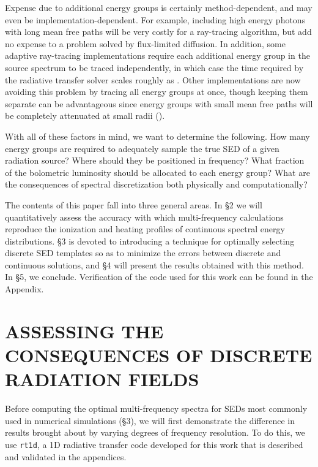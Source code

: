 \documentclass[preprint2]{aastex}              %
\begin{document}
Expense due to additional energy groups is certainly method-dependent, and may even be implementation-dependent.  For example, including high energy photons with long mean free paths will be very costly for a ray-tracing algorithm, but add no expense to a problem solved by flux-limited diffusion.  In addition, some adaptive ray-tracing implementations require each additional energy group in the source spectrum to be traced independently, in which case the time required by the radiative transfer solver scales roughly as \nnu.  Other implementations are now avoiding this problem by tracing all energy groups at once, though keeping them separate can be advantageous since energy groups with small mean free paths will be completely attenuated at small radii (\cite{Wise2011}).

With all of these factors in mind, we want to determine the following.  How many energy groups are required to adequately sample the true SED of a given radiation source?  Where should they be positioned in frequency?  What fraction of the bolometric luminosity should be allocated to each energy group?  What are the consequences of spectral discretization both physically and computationally?  

The contents of this paper fall into three general areas.  In \S2 we will quantitatively assess the accuracy with which multi-frequency calculations reproduce the ionization and heating profiles of continuous spectral energy distributions.  \S3 is devoted to introducing a technique for optimally selecting discrete SED templates so as to minimize the errors between discrete and continuous solutions, and \S4 will present the results obtained with this method.  In \S5, we conclude.  Verification of the code used for this work can be found in the Appendix.

\section{ASSESSING THE CONSEQUENCES OF DISCRETE RADIATION FIELDS}
Before computing the optimal multi-frequency spectra for SEDs most commonly used in numerical simulations (\S3), we will first demonstrate the difference in results brought about by varying degrees of frequency resolution.  To do this, we use \texttt{rt1d}, a 1D radiative transfer code developed for this work that is described and validated in the appendices.  
\end{document}
